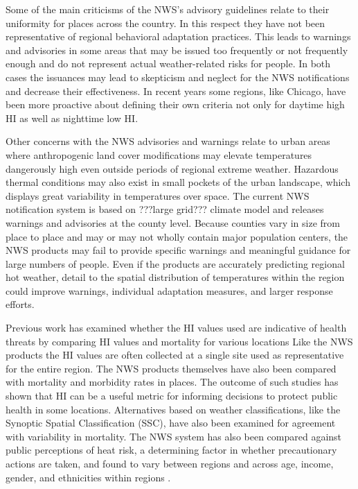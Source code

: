 \documentclass{ametsoc}
\begin{document}
Some of the main criticisms of the NWS's advisory guidelines relate to their uniformity for places across the country. In this respect they have not been representative of regional behavioral adaptation practices. This leads to warnings and advisories in some areas that may be issued too frequently or not frequently enough and do not represent actual weather-related risks for people. In both cases the issuances may lead to skepticism and neglect for the NWS notifications and decrease their effectiveness. In recent years some regions, like Chicago, have been more proactive about defining their own criteria not only for daytime high HI as well as nighttime low HI.

Other concerns with the NWS advisories and warnings relate to urban areas where anthropogenic land cover modifications may elevate temperatures dangerously high even outside periods of regional extreme weather. Hazardous thermal conditions may also exist in small pockets of the urban landscape, which displays great variability in temperatures over space.  The current NWS notification system is based on ???large grid??? climate model and releases warnings and advisories at the county level. Because counties vary in size from place to place and may or may not wholly contain major population centers, the NWS products may fail to provide specific warnings and meaningful guidance for large numbers of people. Even if the products are accurately predicting regional hot weather, detail to the spatial distribution of temperatures within the region could improve warnings, individual adaptation measures, and larger response efforts.

Previous work has examined whether the HI values used are indicative of health threats by comparing HI values and mortality for various locations\citep{Kalkstein1989,Gaffen1998} Like the NWS products the HI values are often collected at a single site used as representative for the entire region. The NWS products themselves have also been compared with mortality and morbidity rates in places. The outcome of such studies has shown that HI can be a useful metric for informing decisions to protect public health in some locations. Alternatives based on weather classifications, like the Synoptic Spatial Classification (SSC), have also been examined for agreement with variability in mortality. The NWS system has also been compared against public perceptions of heat risk, a determining factor in whether precautionary actions are taken, and found to vary between regions and across age, income, gender, and ethnicities within regions \citep{Kalkstein2007}.
\end{document}
